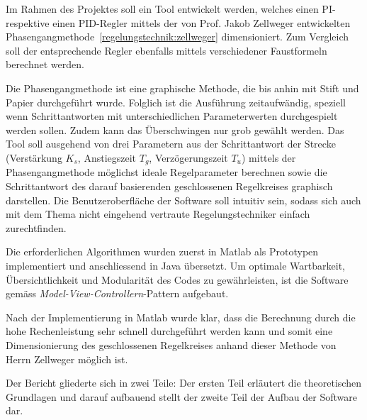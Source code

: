 Im   Rahmen  des   Projektes  soll   ein  Tool   entwickelt  werden,   welches
einen   PI-  respektive   einen   PID-Regler  mittels   der  von   Prof. Jakob
Zellweger    entwickelten   Phasengangmethode~\ref{regelungstechnik:zellweger}
dimensioniert. Zum Vergleich  soll der entsprechende Regler  ebenfalls mittels
verschiedener Faustformeln berechnet werden.

Die Phasengangmethode ist eine graphische Methode, die bis anhin mit Stift und
Papier  durchgef\"uhrt wurde. Folglich  ist die  Ausf\"uhrung zeitaufw\"andig,
speziell   wenn   Schrittantworten   mit   unterschiedlichen   Parameterwerten
durchgespielt werden sollen. Zudem kann das \"Uberschwingen nur grob gew\"ahlt
werden. Das Tool  soll ausgehend  von drei  Parametern aus  der Schrittantwort
der  Strecke  (Verst\"arkung  $K_s$,  Anstiegszeit  $T_g$,  Verz\"ogerungszeit
$T_u$)  mittels   der  Phasengangmethode  m\"oglichst   ideale  Regelparameter
berechnen  sowie  die  Schrittantwort  des  darauf  basierenden  geschlossenen
Regelkreises graphisch darstellen. Die  Benutzeroberfl\"ache der Software soll
intuitiv  sein, sodass  sich  auch  mit dem  Thema  nicht eingehend  vertraute
Regelungstechniker einfach zurechtfinden.

Die  erforderlichen  Algorithmen  wurden   zuerst  in  Matlab  als  Prototypen
implementiert und anschliessend in Java \"ubersetzt.  Um optimale Wartbarkeit,
\"Ubersichtlichkeit und  Modularit\"at des  Codes zu gew\"ahrleisten,  ist die
Software gem\"ass \emph{Model-View-Controllern}-Pattern aufgebaut.

Nach der Implementierung  in Matlab wurde klar, dass die  Berechnung durch die
hohe Rechenleistung  sehr schnell  durchgef\"uhrt werden  kann und  somit eine
Dimensionierung des geschlossenen Regelkreises anhand dieser Methode von Herrn
Zellweger m\"oglich ist.

Der  Bericht gliederte  sich in  zwei Teile: Der  ersten Teil  erl\"autert die
theoretischen  Grundlagen und  darauf  aufbauend stellt  der  zweite Teil  der
Aufbau der Software dar.
